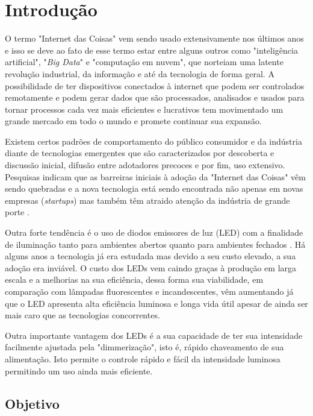 \chapter{Introdução}

O termo "Internet das Coisas" \space vem sendo usado extensivamente nos últimos anos e isso se deve ao fato de esse termo estar entre alguns 
outros como "inteligência artificial", "\textit{Big Data}" \space e "computação em nuvem", que norteiam uma latente revolução industrial, da informação e até da tecnologia de forma geral. A possibilidade de ter dispositivos conectados à internet que podem ser controlados remotamente e podem gerar dados que são processados, analisados e usados para tornar processos cada vez mais eficientes e lucrativos tem movimentado um grande mercado em todo o mundo e promete continuar sua expansão. 

Existem certos padrões de comportamento do público consumidor e da indústria diante de  tecnologias emergentes que são caracterizados por descoberta e discussão inicial, difusão entre adotadores precoces e por fim, uso extensivo. Pesquisas indicam que as barreiras iniciais à adoção da "Internet das Coisas" \space vêm sendo quebradas e a nova tecnologia está sendo encontrada não apenas em novas empresas (\textit{startups}) mas também têm atraido atenção da indústria de grande porte \cite{forbes}. 

Outra forte tendência é o uso de diodos emissores de luz (LED) com a finalidade de iluminação tanto para ambientes abertos quanto para ambientes fechados \cite{bndes}. Há alguns anos a tecnologia já era estudada mas devido a seu custo elevado, a sua adoção era inviável. O custo dos LEDs vem caindo graças à produção em larga escala e a melhorias na sua eficiência, dessa forma sua viabilidade, em comparação com lâmpadas fluorescentes e incandescentes, vêm aumentando já que o LED apresenta alta eficiência luminosa e longa vida útil apesar de ainda ser mais caro que as tecnologias concorrentes.

Outra importante vantagem dos LEDs é a sua capacidade de ter sua intensidade facilmente ajustada pela "dimmerização", isto é, rápido chaveamento de sua alimentação. Isto permite o controle rápido e fácil da intensidade luminosa permitindo um uso ainda mais eficiente.

\section{Objetivo}

